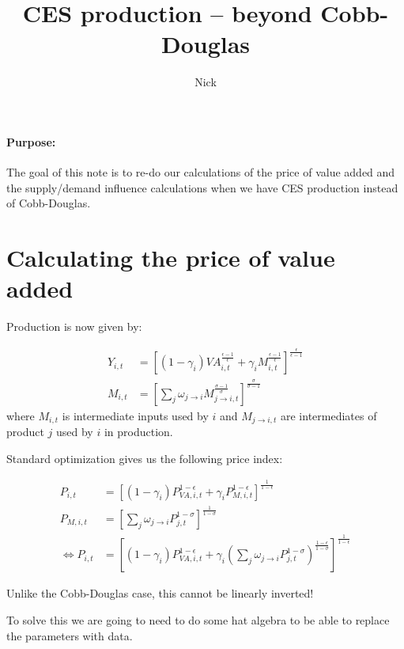 \documentclass[12pt,english]{article}
\begin{document}
\title{CES production -- beyond Cobb-Douglas}
\author{Nick}
\maketitle

\paragraph{Purpose:} The goal of this note is to re-do our calculations of the price of value added and the supply/demand influence calculations when we have CES production instead of Cobb-Douglas.



\section*{Calculating the price of value added}

Production is now given by:

\begin{align*}
	Y_{i,t} &= \left[(1-\gamma_i)VA_{i,t}^{\frac{\epsilon-1}{\epsilon}} + \gamma_i M_{i,t}^{\frac{\epsilon-1}{\epsilon}}\right]^{\frac{\epsilon}{\epsilon-1}}\\
	M_{i,t} &= \left[\sum_j\omega_{j\rightarrow i} M_{j\rightarrow i,t}^{\frac{\sigma-1}{\sigma}}\right]^{\frac{\sigma}{\sigma-1}}
\end{align*}
where $M_{i,t}$ is intermediate inputs used by $i$ and $M_{j\rightarrow i,t}$ are intermediates of product $j$ used by $i$ in production.

Standard optimization gives us the following price index:

\begin{align*}
	P_{i,t} &= \left[(1-\gamma_i)P_{VA,i,t}^{1-\epsilon} + \gamma_i P_{M,i,t}^{1-\epsilon}\right]^{\frac{1}{1-\epsilon}}\\
	P_{M,i,t} &= \left[\sum_j \omega_{j\rightarrow i}P_{j,t}^{1-\sigma}\right]^{\frac{1}{1-\sigma
}}\\
	\Leftrightarrow P_{i,t} &= \left[(1-\gamma_i)P_{VA,i,t}^{1-\epsilon} + \gamma_i \left(\sum_j \omega_{j\rightarrow i}P_{j,t}^{1-\sigma}\right)^{\frac{1-\epsilon}{1-\sigma}}\right]^{\frac{1}{1-\epsilon}}
\end{align*}

Unlike the Cobb-Douglas case, this cannot be linearly inverted!

To solve this we are going to need to do some hat algebra to be able to replace the parameters with data.
\end{document}
